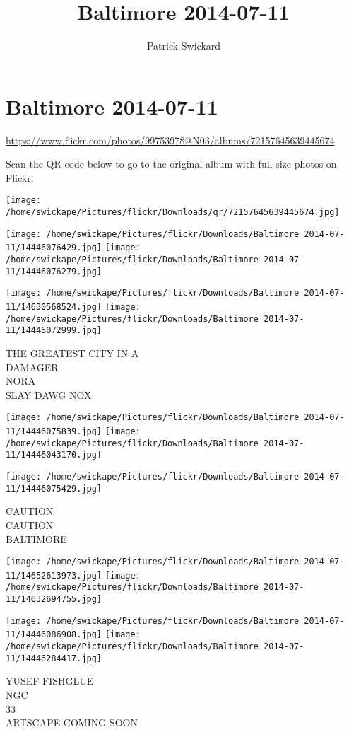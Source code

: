 \documentclass[10pt,letterpaper]{article}
\title{Baltimore 2014-07-11}
\author{Patrick Swickard}
\date{}
\begin{document}
\section*{Baltimore 2014-07-11}

\url{https://www.flickr.com/photos/99753978@N03/albums/72157645639445674}

Scan the QR code below to go to the original album with full-size photos on Flickr:

\texttt{[image: /home/swickape/Pictures/flickr/Downloads/qr/72157645639445674.jpg]}
\pagebreak

\texttt{[image: /home/swickape/Pictures/flickr/Downloads/Baltimore 2014-07-11/14446076429.jpg]}
\texttt{[image: /home/swickape/Pictures/flickr/Downloads/Baltimore 2014-07-11/14446076279.jpg]}

\texttt{[image: /home/swickape/Pictures/flickr/Downloads/Baltimore 2014-07-11/14630568524.jpg]}
\texttt{[image: /home/swickape/Pictures/flickr/Downloads/Baltimore 2014-07-11/14446072999.jpg]}

THE GREATEST CITY IN A\\
DAMAGER\\
NORA\\
SLAY DAWG NOX
\pagebreak

\texttt{[image: /home/swickape/Pictures/flickr/Downloads/Baltimore 2014-07-11/14446075839.jpg]}
\texttt{[image: /home/swickape/Pictures/flickr/Downloads/Baltimore 2014-07-11/14446043170.jpg]}

\vspace{0.25in}
\texttt{[image: /home/swickape/Pictures/flickr/Downloads/Baltimore 2014-07-11/14446075429.jpg]}

CAUTION\\
CAUTION\\
BALTIMORE
\pagebreak

\texttt{[image: /home/swickape/Pictures/flickr/Downloads/Baltimore 2014-07-11/14652613973.jpg]}
\texttt{[image: /home/swickape/Pictures/flickr/Downloads/Baltimore 2014-07-11/14632694755.jpg]}

\texttt{[image: /home/swickape/Pictures/flickr/Downloads/Baltimore 2014-07-11/14446086908.jpg]}
\texttt{[image: /home/swickape/Pictures/flickr/Downloads/Baltimore 2014-07-11/14446284417.jpg]}

YUSEF FISHGLUE\\
NGC\\
33\\
ARTSCAPE COMING SOON
\pagebreak
\end{document}

